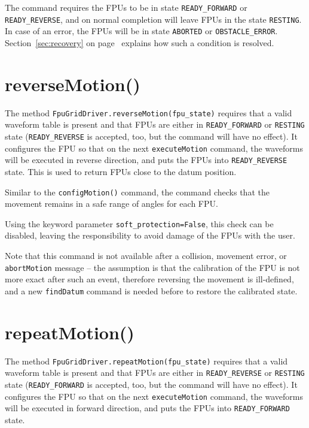 \documentclass[fontsize=12,a4paper]{scrreprt}
\begin{document}
The command requires the FPUs to be in state \texttt{READY\_FORWARD}
or \texttt{READY\_REVERSE}, and on normal completion will leave FPUs
in the state \texttt{RESTING}. In case of an error, the FPUs will be
in state \texttt{ABORTED} or \texttt{OBSTACLE\_ERROR}.
Section~\ref{sec:recovery} on page~\pageref{sec:recovery} explains how
such a condition is resolved.



\section{reverseMotion()}

\begin{sloppypar}
The method \texttt{FpuGridDriver.reverseMotion(fpu\_state)} requires
that a valid waveform table is present and that FPUs are either in
\texttt{READY\_FORWARD} or \texttt{RESTING} state
(\texttt{READY\_REVERSE} is accepted, too, but the command will have
no effect). It configures the FPU so that on the next
\texttt{executeMotion} command, the waveforms will be executed in
reverse direction, and puts the FPUs into \texttt{READY\_REVERSE}
state. This is used to return FPUs close to the datum position.
\end{sloppypar}

Similar to the \texttt{configMotion()} command, the command checks
that the movement remains in a safe range of angles for each
FPU.

Using the keyword parameter \texttt{soft\_protection=False}, this
check can be disabled, leaving the responsibility to avoid damage of
the FPUs with the user.


Note that this command is not available after a collision, movement
error, or \texttt{abortMotion} message -- the assumption is that the
calibration of the FPU is not more exact after such an event,
therefore reversing the movement is ill-defined, and a new
\texttt{findDatum} command is needed before to restore the calibrated
state.


\section{repeatMotion()}

\begin{sloppypar}
The method \texttt{FpuGridDriver.repeatMotion(fpu\_state)} requires
that a valid waveform table is present and that FPUs are either in
\texttt{READY\_REVERSE} or \texttt{RESTING} state
(\texttt{READY\_FORWARD} is accepted, too, but the command will have
no effect). It configures the FPU so that on the next
\texttt{executeMotion} command, the waveforms will be executed in
forward direction, and puts the FPUs into \texttt{READY\_FORWARD}
state.
\end{sloppypar}
\end{document}
